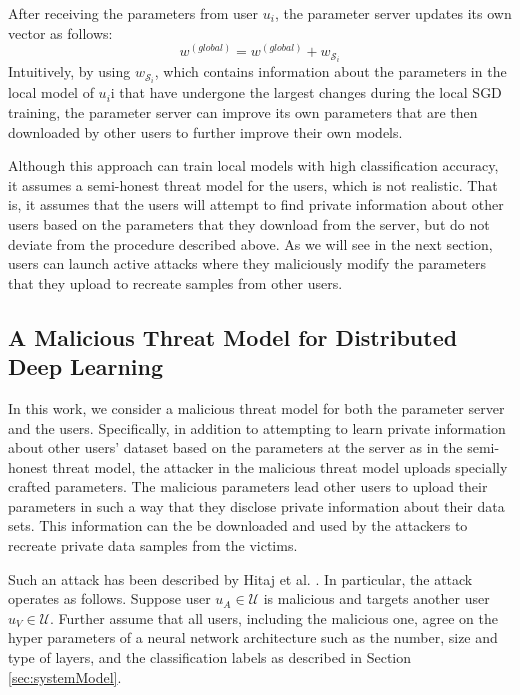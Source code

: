 \documentclass[conference]{IEEEtran}
\begin{document}
After receiving the parameters from user $u_i$, the parameter server updates its own vector as follows:
$$w^{(global)} =  w^{(global)} +  w_{\mathcal{S}_i}$$
Intuitively, by using $w_{\mathcal{S}_i}$, which contains information about the parameters in the local model of $u_i$i that have
undergone the largest changes during the local SGD training, the parameter server can improve its own parameters that are then
downloaded by other users to further improve their own models.  

Although this approach can train local models with high classification accuracy,  it assumes a semi-honest threat model for the users,
which is not realistic. That is, it assumes that the users will attempt to find private information about other users based on 
the parameters that they download from the server, but do not deviate from the procedure described above. As we will see in the next
section, users can launch active attacks where they maliciously modify the parameters that they upload to recreate samples from other
users. 

\subsection{A Malicious Threat Model for Distributed Deep Learning}\label{sec:threatModel}

In this work, we consider a malicious threat model for both the parameter server and the users. Specifically, in addition to
attempting to learn private information about other users' dataset based on the parameters at the server as in the semi-honest threat
model, the attacker in the malicious threat model uploads
specially crafted parameters. The malicious parameters lead other users to upload their parameters in such a way that they disclose private information about their data sets. This information can the be downloaded and used by the
attackers to recreate private data samples from the victims. 

Such an attack has been described by Hitaj et al. \cite{hitaj2017deep}. In particular, the attack operates as follows. 
Suppose user $u_A\in\mathcal{U}$ is malicious and targets another user $u_V\in\mathcal{U}$. Further assume that all users, including
the malicious one, agree on the hyper parameters of a neural network architecture such as the number, size and type of layers,  and the
classification labels as described in Section \ref{sec:systemModel}.
\end{document}
